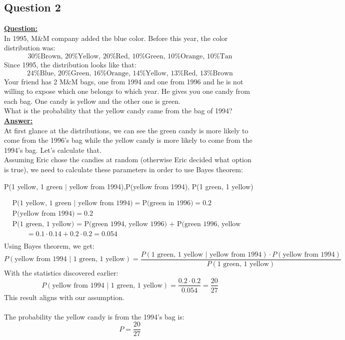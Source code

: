 \documentclass[a4, 12pt,titlepage]{scrartcl}
\begin{document}
\subsection{Question 2}
\textbf{\underline{Question:}}\\
In 1995, M\&M company added the blue color. Before this year, the color distribution was:\[
\textrm{30\% Brown, 20\% Yellow, 20\% Red, 10\% Green, 10\% Orange, 10\% Tan}
\]
Since 1995, the distribution looks like that:\[
\textrm{24\% Blue, 20\% Green, 16\% Orange, 14\% Yellow, 13\% Red, 13\% Brown}
\]
Your friend has 2 M\&M bags, one from 1994 and one from 1996 and he is not willing to expose which one belongs to which year. He gives you one candy from each bag. One candy is yellow and the other one is green.\\
What is the probability that the yellow candy came from the bag of 1994?\\

\textbf{\underline{Answer:}}\\
At first glance at the distributions, we can see the green candy is more likely to come from the 1996's bag while the yellow candy is more likely to come from the 1994's bag. Let's calculate that.\\

Assuming Eric chose the candies at random (otherwise Eric decided what option is true), we need to calculate these parameters in order to use Bayes theorem:
\begin{center}
\quad P(1 yellow, 1 green $|$ yellow from 1994),\quad P(yellow from 1994), \quad P(1 green, 1 yellow)
\end{center}\smallskip
\begin{align*}
&\textrm{P(1 yellow, 1 green $|$ yellow from 1994)}=\textrm{P(green in 1996)}=0.2\\
&\textrm{P(yellow from 1994)}=0.2\\
&\textrm{P(1 green, 1 yellow) = P(green 1994, yellow 1996) + P(green 1996, yellow 1994)}\\
&\qquad=0.1\cdot 0.14+0.2\cdot 0.2=0.054\\
\end{align*}Using Bayes theorem, we get:\[
P(\textrm{yellow from 1994 $|$ 1 green, 1 yellow})=\frac{P(\textrm{1 green, 1 yellow $|$ yellow from 1994})\cdot P(\textrm{yellow from 1994})}{P(\textrm{1 green, 1 yellow})}
\]
With the statistics discovered earlier:\[
P(\textrm{yellow from 1994 $|$ 1 green, 1 yellow})=\frac{0.2\cdot 0.2}{0.054}=\frac{20}{27}
\]
This result aligns with our assumption.\\\smallskip\\
The probability the yellow candy is from the 1994's bag is:
\[
\boxed{P=\frac{20}{27}}
\]
\newpage
\end{document}
